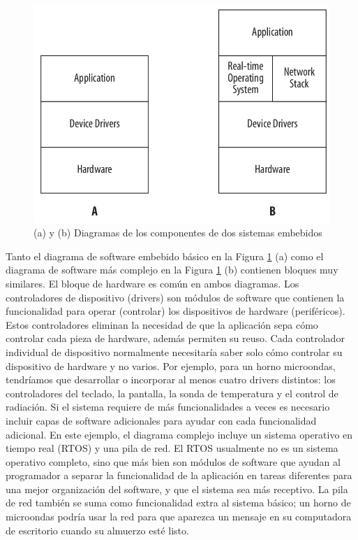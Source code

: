 \documentclass[output=paper, 
colorlinks,
citecolor=brown,
newtxmath
]{langscibook}
\begin{document}
\begin{figure}[h]
\includegraphics[scale=0.3]{images/sistema-embebido-basico.png}
\caption{(a) y (b) Diagramas de los componentes de dos sistemas embebidos}
\label{fig:sistema-embebido-basico}
\end{figure}


Tanto el diagrama de software embebido básico en la Figura \ref{fig:sistema-embebido-basico} (a) como el diagrama de software más complejo 
en la Figura \ref{fig:sistema-embebido-basico} (b) contienen bloques muy similares. El bloque de hardware es común en ambos diagramas.
Los controladores de dispositivo (drivers) son módulos de software que contienen la funcionalidad 
para operar (controlar) los dispositivos de hardware (periféricos). Estos controladores
eliminan la necesidad de que la aplicación sepa cómo controlar cada pieza de hardware, además permiten su reuso. 
Cada controlador individual de dispositivo normalmente necesitaría saber solo cómo controlar su dispositivo de hardware y no varios. 
Por ejemplo, para un horno microondas, tendríamos que desarrollar o incorporar al menos cuatro drivers distintos: 
los controladores del teclado, la pantalla, la sonda de temperatura y el control de radiación.
Si el sistema requiere de más funcionalidades a veces es necesario incluir capas 
de software adicionales para ayudar con cada funcionalidad adicional. 
En este ejemplo, el diagrama complejo incluye un sistema operativo en tiempo real (RTOS) 
y una pila de red. El RTOS usualmente no es un sistema operativo completo, sino que más
bien son módulos de software que ayudan al programador a separar la funcionalidad 
de la aplicación en tareas diferentes para una mejor organización del software,
y que el sistema sea más receptivo. 
La pila de red también se suma como funcionalidad extra al sistema básico; 
un horno de microondas podría usar la red para que aparezca un mensaje 
en su computadora de escritorio cuando su almuerzo esté listo.
\end{document}
